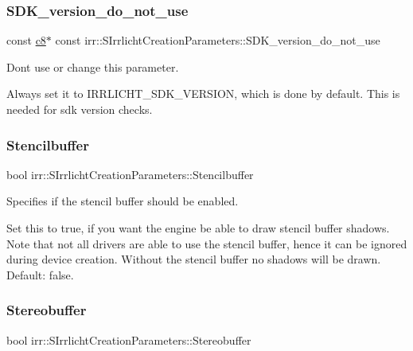 \subsubsection{\texorpdfstring{S\+D\+K\+\_\+version\+\_\+do\+\_\+not\+\_\+use}{SDK\_version\_do\_not\_use}}
{\footnotesize\ttfamily const \hyperlink{namespaceirr_a9395eaea339bcb546b319e9c96bf7410}{c8}$\ast$ const irr\+::\+S\+Irrlicht\+Creation\+Parameters\+::\+S\+D\+K\+\_\+version\+\_\+do\+\_\+not\+\_\+use}



Don\textquotesingle{}t use or change this parameter. 

Always set it to I\+R\+R\+L\+I\+C\+H\+T\+\_\+\+S\+D\+K\+\_\+\+V\+E\+R\+S\+I\+ON, which is done by default. This is needed for sdk version checks. \mbox{\label{structirr_1_1SIrrlichtCreationParameters_a8120cfeac3fbf8b12b1e5f6bd6a8ec2f}} 
\subsubsection{\texorpdfstring{Stencilbuffer}{Stencilbuffer}}
{\footnotesize\ttfamily bool irr\+::\+S\+Irrlicht\+Creation\+Parameters\+::\+Stencilbuffer}



Specifies if the stencil buffer should be enabled. 

Set this to true, if you want the engine be able to draw stencil buffer shadows. Note that not all drivers are able to use the stencil buffer, hence it can be ignored during device creation. Without the stencil buffer no shadows will be drawn. Default\+: false. \mbox{\label{structirr_1_1SIrrlichtCreationParameters_ae5dd722bd6c5a7001b73ef92264220a5}} 
\subsubsection{\texorpdfstring{Stereobuffer}{Stereobuffer}}
{\footnotesize\ttfamily bool irr\+::\+S\+Irrlicht\+Creation\+Parameters\+::\+Stereobuffer}



